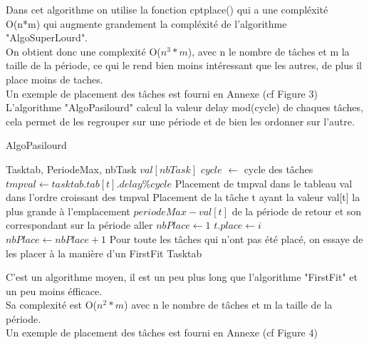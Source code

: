 \documentclass[11pt]{article}
\begin{document}
Dans cet algorithme on utilise la fonction cptplace() qui a une compléxité O(n*m) qui augmente grandement la compléxité de l'algorithme "AlgoSuperLourd".\\
On obtient donc une complexité O($n^3*m$), avec n le nombre de tâches et m la taille de la période, ce qui le rend bien moins intéressant que les autres, de plus il place moins de taches.\\
Un exemple de placement des tâches est fourni en Annexe (cf Figure 3)\\

\newpage
L'algorithme "AlgoPasilourd" calcul la valeur delay mod(cycle) de chaques tâches, cela permet de les regrouper sur une période et de bien les ordonner sur l'autre.\\
\begin{algorithm}
    \caption{AlgoPasilourd}
    \begin{algorithmic}
    \REQUIRE Tasktab, PeriodeMax, nbTask
    \STATE $val[nbTask]$
    \STATE $cycle$ $\leftarrow$ cycle des tâches
        \STATE $tmpval \leftarrow tasktab.tab[t].delay\%cycle$
        \STATE Placement de tmpval dans le tableau val dans l'ordre croissant des tmpval
    \ENDFOR
    \STATE Placement de la tâche t ayant la valeur val[t] la plus grande à l'emplacement $periodeMax - val[t]$ de la période de retour et son correspondant sur la période aller
    \STATE $nbPlace \leftarrow 1$
                        \STATE $t.place \leftarrow i$
                    \ENDIF
                \ENDFOR
                \STATE $nbPlace \leftarrow nbPlace+1$
            \ENDIF
        \ENDFOR
    \ENDFOR
    \STATE Pour toute les tâches qui n'ont pas été placé, on essaye de les placer à la manière d'un FirstFit
    \RETURN Tasktab
    \end{algorithmic}
\end{algorithm}

C'est un algorithme moyen, il est un peu plus long que l'algorithme "FirstFit" et un peu moins éfficace.\\
Sa complexité est O($n^2*m$) avec n le nombre de tâches et m la taille de la période.\\ 
Un exemple de placement des tâches est fourni en Annexe (cf Figure 4)\\
\end{document}
